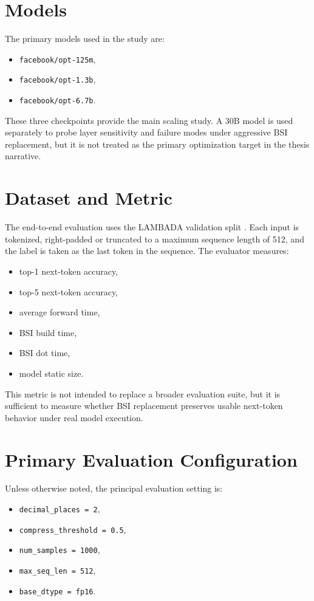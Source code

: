 \section{Models}
The primary models used in the study are:

\begin{itemize}[leftmargin=2em]
\item \texttt{facebook/opt-125m},
\item \texttt{facebook/opt-1.3b},
\item \texttt{facebook/opt-6.7b}.
\end{itemize}

These three checkpoints provide the main scaling study. A 30B model is used separately to probe layer sensitivity and failure modes under aggressive BSI replacement, but it is not treated as the primary optimization target in the thesis narrative.

\section{Dataset and Metric}
The end-to-end evaluation uses the LAMBADA validation split \cite{lambada}. Each input is tokenized, right-padded or truncated to a maximum sequence length of 512, and the label is taken as the last token in the sequence. The evaluator measures:

\begin{itemize}[leftmargin=2em]
\item top-1 next-token accuracy,
\item top-5 next-token accuracy,
\item average forward time,
\item BSI build time,
\item BSI dot time,
\item model static size.
\end{itemize}

This metric is not intended to replace a broader evaluation suite, but it is sufficient to measure whether BSI replacement preserves usable next-token behavior under real model execution.

\section{Primary Evaluation Configuration}
Unless otherwise noted, the principal evaluation setting is:

\begin{itemize}[leftmargin=2em]
\item \texttt{decimal\_places = 2},
\item \texttt{compress\_threshold = 0.5},
\item \texttt{num\_samples = 1000},
\item \texttt{max\_seq\_len = 512},
\item \texttt{base\_dtype = fp16}.
\end{itemize}

